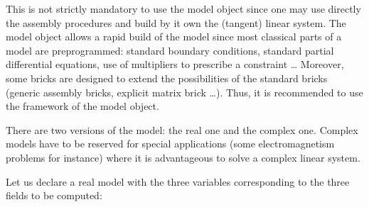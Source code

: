 \documentclass[a4paper,11pt,english]{sphinxmanual}
\begin{document}
\sphinxAtStartPar
This is not strictly mandatory to use the model object since one may use directly the assembly procedures and build by it own the (tangent) linear system. The model object allows a rapid build of the model since most classical parts of a model are pre\sphinxhyphen{}programmed: standard boundary conditions, standard partial differential equations, use of multipliers to prescribe a constraint … Moreover, some bricks are designed to extend the possibilities of the standard bricks (generic assembly bricks, explicit matrix brick …). Thus, it is recommended to use the framework of the model object.

\sphinxAtStartPar
There are two versions of the model: the real one and the complex one. Complex models have to be reserved for special applications (some electromagnetism problems for instance) where it is advantageous to solve a complex linear system.

\sphinxAtStartPar
Let us declare a real model with the three variables corresponding to the three fields to be computed:
\end{document}

